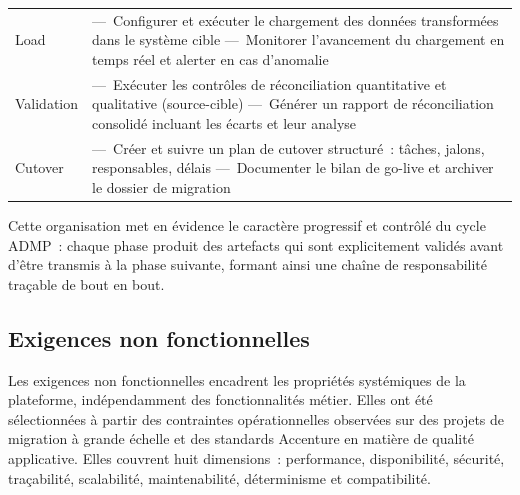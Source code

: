 \begin{table}[H]
\begin{tabularx}{\textwidth}{p{4cm}X}
\addlinespace
Load &
  ---~Configurer et exécuter le chargement des données transformées dans le système cible\newline
  ---~Monitorer l'avancement du chargement en temps réel et alerter en cas d'anomalie \\
\addlinespace
Validation &
  ---~Exécuter les contrôles de réconciliation quantitative et qualitative (source-cible)\newline
  ---~Générer un rapport de réconciliation consolidé incluant les écarts et leur analyse \\
\addlinespace
Cutover &
  ---~Créer et suivre un plan de cutover structuré~: tâches, jalons, responsables, délais\newline
  ---~Documenter le bilan de go-live et archiver le dossier de migration \\
\bottomrule
\end{tabularx}
\end{table}

Cette organisation met en évidence le caractère progressif et contrôlé du cycle ADMP~: chaque phase produit des artefacts qui sont explicitement validés avant d'être transmis à la phase suivante, formant ainsi une chaîne de responsabilité traçable de bout en bout.

\subsection{Exigences non fonctionnelles}
\label{subsec:enf}

Les exigences non fonctionnelles encadrent les propriétés systémiques de la plateforme, indépendamment des fonctionnalités métier. Elles ont été sélectionnées à partir des contraintes opérationnelles observées sur des projets de migration à grande échelle et des standards Accenture en matière de qualité applicative. Elles couvrent huit dimensions~: performance, disponibilité, sécurité, traçabilité, scalabilité, maintenabilité, déterminisme et compatibilité.

